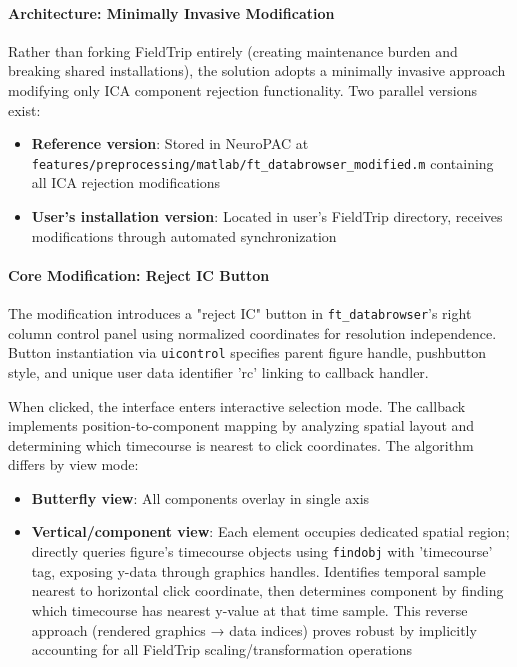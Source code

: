 \documentclass[12pt]{report}
\begin{document}
\paragraph{Architecture: Minimally Invasive Modification}\mbox{}

Rather than forking FieldTrip entirely (creating maintenance burden and breaking shared installations), the solution adopts a minimally invasive approach modifying only ICA component rejection functionality. Two parallel versions exist:

\begin{itemize}
\item \textbf{Reference version}: Stored in NeuroPAC at \verb|features/preprocessing/matlab/ft_databrowser_modified.m| containing all ICA rejection modifications
\item \textbf{User's installation version}: Located in user's FieldTrip directory, receives modifications through automated synchronization
\end{itemize}

\paragraph{Core Modification: Reject IC Button}\mbox{}

The modification introduces a "reject IC" button in \verb|ft_databrowser|'s right column control panel using normalized coordinates for resolution independence. Button instantiation via \verb|uicontrol| specifies parent figure handle, pushbutton style, and unique user data identifier 'rc' linking to callback handler.

When clicked, the interface enters interactive selection mode. The callback implements position-to-component mapping by analyzing spatial layout and determining which timecourse is nearest to click coordinates. The algorithm differs by view mode:

\begin{itemize}
\item \textbf{Butterfly view}: All components overlay in single axis
\item \textbf{Vertical/component view}: Each element occupies dedicated spatial region; directly queries figure's timecourse objects using \verb|findobj| with 'timecourse' tag, exposing y-data through graphics handles. Identifies temporal sample nearest to horizontal click coordinate, then determines component by finding which timecourse has nearest y-value at that time sample. This reverse approach (rendered graphics → data indices) proves robust by implicitly accounting for all FieldTrip scaling/transformation operations
\end{itemize}
\end{document}
